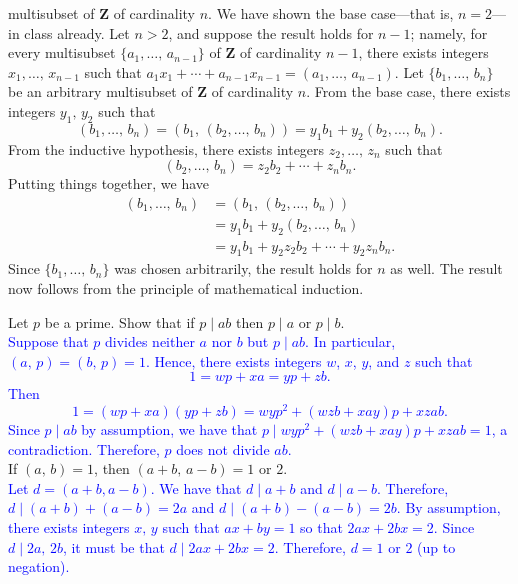\documentclass[a4paper,11pt]{article}
\theoremstyle{mythm}
\theoremstyle{mydef}
\newcommand{\blue}[1]{\textcolor{blue}{#1}}
\newcommand{\Z}{\mathbf{Z}}
\begin{document}
{\begin{enumerate}[(a)]
multisubset of $\Z$ of cardinality $n$. We have shown the base case---that is,
$n=2$---in class already. Let $n>2$, and suppose the result holds for $n-1$;
namely, for every multisubset $\{a_1,\dots,\,a_{n-1}\}$ of $\Z$ of cardinality
$n-1$, there exists integers $x_1,\dots,\,x_{n-1}$ such that
$a_1x_1+\cdots+a_{n-1}x_{n-1}=(a_1,\dots,\,a_{n-1})$. Let $\{b_1,\dots,\,b_n\}$
be an arbitrary multisubset of $\Z$ of cardinality $n$. From the base case,
there exists integers $y_1,\,y_2$ such that
\[
  (b_1,\dots,\,b_n) = (b_1,\,(b_2,\dots,\,b_n)) = y_1b_1 + y_2(b_2,\dots,\,b_n).
\]
From the inductive hypothesis, there exists integers $z_2,\dots,\,z_n$ such that
\[
  (b_2,\dots,\,b_n) = z_2b_2+\cdots+z_nb_n.
\]
Putting things together, we have
\begin{align*}
  (b_1,\dots,\,b_n) &= (b_1,\,(b_2,\dots,\,b_n)) \\
                    &= y_1b_1+y_2(b_2,\dots,\,b_n) \\
                    &= y_1b_1+y_2z_2b_2+\cdots+y_2z_nb_n.
\end{align*}
Since $\{b_1,\dots,\,b_n\}$ was chosen arbitrarily, the result holds for $n$ as
well. The result now follows from the principle of mathematical induction.
\end{enumerate}}

 Let $p$ be a prime. Show that if $p \mid ab$ then $p
\mid a$ or $p \mid b$. \\

\blue{Suppose that $p$ divides neither $a$ nor $b$ but $p \mid ab$. In
particular, $(a,\,p)=(b,\,p)=1$. Hence, there exists integers $w$, $x$, $y$, and
$z$ such that
  \[
    1 = wp+xa = yp+zb.
  \]
  Then
  \[
    1=(wp+xa)(yp+zb) = wyp^2+(wzb+xay)p+xzab.
  \]
  Since $p \mid ab$ by assumption, we have that $p \mid
  wyp^2+(wzb+xay)p+xzab=1$, a contradiction. Therefore, $p$ does not divide
  $ab$.} \\

 If $(a,\,b)=1$, then $(a+b,\,a-b)=1\text{ or }2$. \\

\blue{Let $d=(a+b,a-b)$. We have that $d \mid a+b$ and $d \mid a-b$. Therefore,
  $d \mid (a+b)+(a-b)=2a$ and $d \mid (a+b)-(a-b)=2b$. By assumption, there
  exists integers $x,\,y$ such that $ax+by=1$ so that $2ax+2bx=2$. Since $d \mid
  2a,\,2b$, it must be that $d \mid 2ax+2bx=2$. Therefore, $d=1\text{ or }2$ (up
  to negation).} \\
\end{document}
